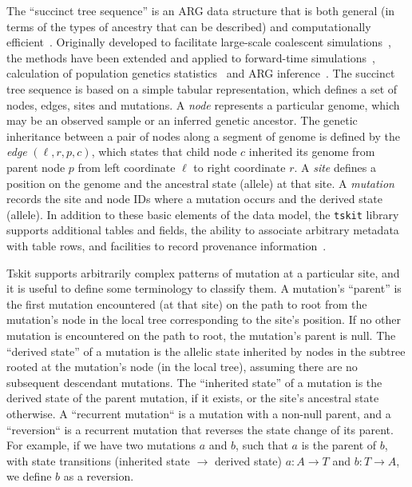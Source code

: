 \documentclass{article}
\begin{document}
The ``succinct tree sequence'' is an ARG data structure
that is both general (in terms of the types of ancestry that can
be described) and computationally efficient~\citep{Wong2023-efficient}.
Originally developed to facilitate large-scale coalescent
simulations~\citep{Kelleher2016-wk}, the methods have been
extended and applied to forward-time
simulations~\citep{Kelleher2018-xc,Haller2018-tree},
calculation of population genetics statistics~\citep{Ralph2020-efficiently}
and ARG inference~\citep{Kelleher2019-ba,Wohns2022-th}.
The succinct tree sequence is based on a simple tabular representation,
which defines a set of nodes, edges, sites and mutations. A \emph{node}
represents a particular genome, which may be an observed sample
or an inferred genetic ancestor. The genetic inheritance between
a pair of nodes along a segment of genome is defined by
the \emph{edge} $(\ell, r, p, c)$, which states that
child node $c$ inherited its genome from parent node $p$
from left coordinate $\ell$ to right coordinate $r$. A \emph{site}
defines a position on the genome
and the ancestral state (allele) at that site.
A \emph{mutation} records the site and node IDs where a mutation
occurs and the derived state (allele).
In addition to these basic elements of the data model, the \texttt{tskit} library
supports additional tables and fields,
the ability to associate arbitrary metadata with
table rows, and facilities to record provenance
information~\citep{Tskit2023-tskit}.

Tskit supports arbitrarily complex patterns of mutation at a particular
site, and it is useful
to define some terminology to classify them.
A mutation's ``parent''
is the first mutation encountered (at that site) on the path to
root from the mutation's node in the local tree corresponding to
the site's position. If no other mutation is encountered on the
path to root, the mutation's parent is null.
The ``derived state'' of a mutation is the allelic state inherited by nodes
in the subtree rooted at the mutation's node (in the local tree), assuming
there are no subsequent descendant mutations.
The ``inherited state'' of a mutation is the derived state of the
parent mutation, if it exists, or the site's ancestral state otherwise.
A ``recurrent mutation`` is a mutation with a non-null parent,
and a ``reversion`` is a recurrent mutation that reverses the state
change of its parent. For example, if we have two mutations
$a$ and $b$, such that $a$ is the parent of $b$,
with state transitions (inherited state $\rightarrow$ derived state)
$a: A\rightarrow T$ and $b: T\rightarrow A$, we define $b$ as a reversion.
\end{document}
